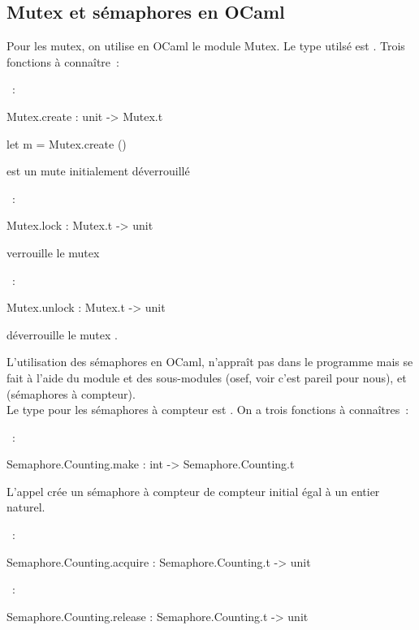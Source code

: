 \begin{adjustwidth}{-3cm}{-3cm}
\subsection{Mutex et sémaphores en OCaml}
Pour les mutex, on utilise en OCaml le module Mutex. Le type utilsé est . Trois fonctions à connaître~:
\begin{enumeratebf}
    \item {}~:
    \begin{lstOCaml}
    Mutex.create : unit -> Mutex.t
    \end{lstOCaml}
    \begin{lstOCaml}
    let m = Mutex.create ()
    \end{lstOCaml}
     est un mute initialement déverrouillé
    \item {}~:
    \begin{lstOCaml}
    Mutex.lock : Mutex.t -> unit
    \end{lstOCaml}
     verrouille le mutex 
    \item {}~:
    \begin{lstOCaml}
    Mutex.unlock : Mutex.t -> unit
    \end{lstOCaml}
     déverrouille le mutex .   
\end{enumeratebf}
L'utilisation des sémaphores en OCaml, n'appraît pas dans le programme mais se fait à l'aide du module  et des sous-modules  (osef, voir  c'est pareil pour nous), et  (sémaphores à compteur).\\
Le type pour les sémaphores à compteur est . On a trois fonctions à connaîtres~:
\begin{enumeratebf}
    \item {}~:
    \begin{lstOCaml}
    Semaphore.Counting.make : int -> Semaphore.Counting.t
    \end{lstOCaml}
    L'appel  crée un sémaphore à compteur de compteur initial égal à  un entier naturel.
    \item {}~:
    \begin{lstOCaml}
    Semaphore.Counting.acquire : Semaphore.Counting.t -> unit
    \end{lstOCaml}
    \item {}~:
    \begin{lstOCaml}
    Semaphore.Counting.release : Semaphore.Counting.t -> unit
    \end{lstOCaml}
\end{enumeratebf}


\end{adjustwidth}

